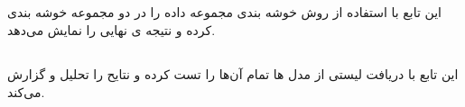 \subsection{}
این تابع با استفاده از روش خوشه بندی 
مجموعه داده را در دو مجموعه خوشه بندی کرده و نتیجه ی نهایی را نمایش می‌دهد.

\subsection{}

این تابع با دریافت لیستی از مدل ها تمام آن‌ها را تست کرده و نتایح را تحلیل و گزارش می‌کند.


